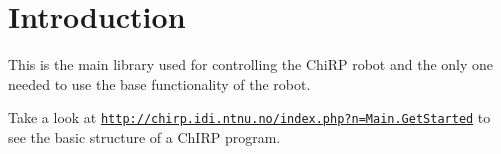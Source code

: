 \hypertarget{index_intro_sec}{}\section{Introduction}\label{index_intro_sec}
This is the main library used for controlling the Chi\-R\-P robot and the only one needed to use the base functionality of the robot.

Take a look at \href{http://chirp.idi.ntnu.no/index.php?n=Main.GetStarted}{\tt http\-://chirp.\-idi.\-ntnu.\-no/index.\-php?n=\-Main.\-Get\-Started} to see the basic structure of a Ch\-I\-R\-P program. 
